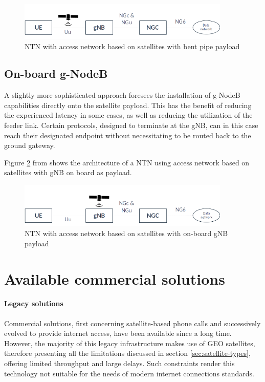 \begin{figure}[ht]
    \centering
    \includegraphics[width=0.9\textwidth]{res/ntn-bent-pipe.png}
    \caption{NTN with access network based on satellites with bent pipe payload \cite{3gpp-tr-38.811}}
    \label{fig:ntn-bent-pipe}
\end{figure}

\subsection{On-board g-NodeB}
\label{sec:onboard-gnb}
A slightly more sophisticated approach foresees the installation of g-NodeB capabilities directly onto the satellite payload. This has the benefit of reducing the experienced latency in some cases, as well as reducing the utilization of the feeder link. Certain protocols, designed to terminate at the \ac{gNB}, can in this case reach their designated endpoint without necessitating to be routed back to the ground gateway.

Figure \ref{fig:ntn-gnb-onboard} from \cite{3gpp-tr-38.811} shows the architecture of a \ac{NTN} using access network based on satellites with \ac{gNB} on board as payload.

\begin{figure}[ht]
    \centering
    \includegraphics[width=0.9\textwidth]{res/ntn-regen.png}
    \caption{NTN with access network based on satellites with on-board gNB payload \cite{3gpp-tr-38.811}}
    \label{fig:ntn-gnb-onboard}
\end{figure}

\section{Available commercial solutions}
\paragraph{Legacy solutions}
Commercial solutions, first concerning satellite-based phone calls and successively evolved to provide internet access, have been available since a long time. However, the majority of this legacy infrastructure makes use of \ac{GEO} satellites, therefore presenting all the limitations discussed in section \ref{sec:satellite-types}, offering limited throughput and large delays. Such constraints render this technology not suitable for the needs of modern internet connections standards.

